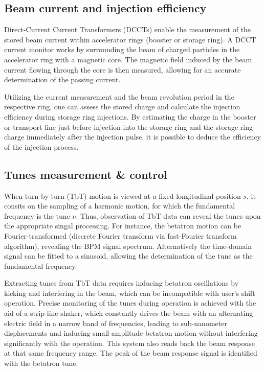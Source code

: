 \subsection{Beam current and injection efficiency}
Direct-Current Current Transformers (DCCTs) enable the measurement of the stored beam current within accelerator rings (booster or storage ring). A DCCT current monitor works by surrounding the beam of charged particles in the accelerator ring with a magnetic core. The magnetic field induced by the beam current flowing through the core is then measured, allowing for an accurate determination of the passing current.

Utilizing the current measurement and the beam revolution period in the respective ring, one can assess the stored charge and calculate the injection efficiency during storage ring injections. By estimating the charge in the booster or transport line just before injection into the storage ring and the storage ring charge immediately after the injection pulse, it is possible to deduce the efficiency of the injection process.
\subsection{Tunes measurement \& control}
When turn-by-turn (TbT) motion is viewed at a fixed longitudinal position $s$, it consits on the sampling of a harmonic motion, for which the fundamental frequency is the tune $\nu$. Thus, observation of TbT data can reveal the tunes upon the appropriate singal processing. For instance, the betatron motion can be Fourier-transformed (discrete Fourier transform via fast-Fourier transform algorithm), revealing the BPM signal spectrum. Alternatively the time-domain signal can be fitted to a sinusoid, allowing the determination of the tune as the fundamental frequency.

Extracting tunes from TbT data requires inducing betatron oscillations by kicking and interfering in the beam, which can be incompatible with user's shift operation. Precise  monitoring of the tunes during operation is achieved with the aid of a strip-line shaker, which constantly drives the beam with an alternating electric field in a narrow band of frequencies, leading to sub-nanometer displacements and inducing small-amplitude betatron motion without interfering significantly with the operation. This system also reads back the beam response at that same frequency range. The peak of the beam response signal is identified with the betatron tune.

